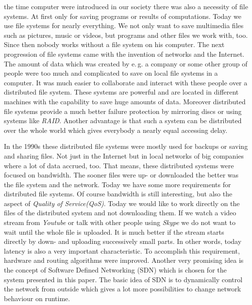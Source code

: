  the time computer were introduced in our society there was also a necessity of file systems. At first only for saving programs or results of computations. Today we use file systems for nearly everything. We not only want to save multimedia files such as pictures, music or videos, but programs and other files we work with, too. Since then nobody works without a file system on his computer. The next progression of file systems came with the invention of networks and the Internet. The amount of data which was created by e.\,g. a company or some other group of people were too much and complicated to save on local file systems in a computer. It was much easier to collaborate and interact with these people over a distributed file system. These systems are powerful and are located in different machines with the capability to save huge amounts of data. Moreover distributed file systems provide a much better failure protection by mirroring discs or using systems like \textit{RAID}. Another advantage is that such a system can be distributed over the whole world which gives everybody a nearly equal accessing delay.

In the 1990s these distributed file systems were mostly used for backups or saving and sharing files. Not just in the Internet but in local networks of big companies where a lot of data accrued, too. That means, these distributed systems were focused on bandwidth. The sooner files were up- or downloaded the better was the file system and the network. Today we have some more requirements for distributed file systems. Of course bandwidth is still interesting, but also the aspect of \textit{Quality of Service(QoS)}. Today we would like to work directly on the files of the distributed system and not downloading them. If we watch a video stream from \textit{Youtube} or talk with other people using \textit{Skype} we do not want to wait until the whole file is uploaded. It is much better if the stream starts directly by down- and uploading successively small parts. In other words, today latency is also a very important characteristic. To accomplish this requirement, hardware and routing algorithms were improved. Another very promising idea is the concept of Software Defined Networking (SDN) which is chosen for the system presented in this paper. The basic idea of SDN is to dynamically control the network from outside which gives a lot more possibilities to change network behaviour on runtime.

